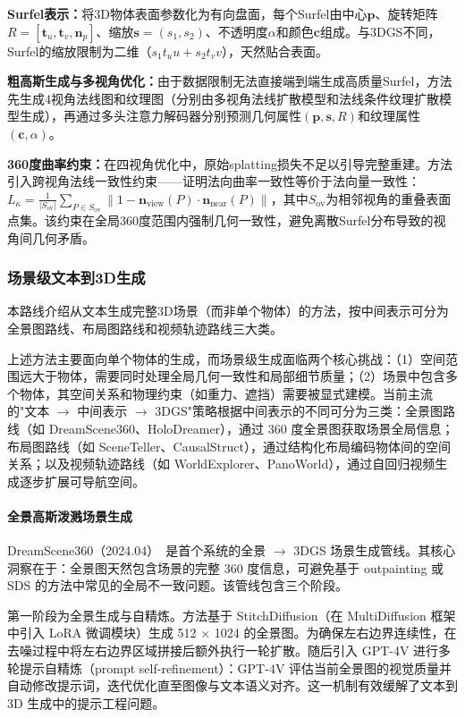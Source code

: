 \textbf{Surfel表示：}将3D物体表面参数化为有向盘面，每个Surfel由中心$\mathbf{p}$、旋转矩阵$R = [\mathbf{t}_u, \mathbf{t}_v, \mathbf{n}_p]$、缩放$\mathbf{s} = (s_1, s_2)$、不透明度$\alpha$和颜色$\mathbf{c}$组成。与3DGS不同，Surfel的缩放限制为二维（$s_1 t_u u + s_2 t_v v$），天然贴合表面。

\textbf{粗高斯生成与多视角优化：}由于数据限制无法直接端到端生成高质量Surfel，方法先生成4视角法线图和纹理图（分别由多视角法线扩散模型和法线条件纹理扩散模型生成），再通过多头注意力解码器分别预测几何属性$(\mathbf{p}, \mathbf{s}, R)$和纹理属性$(\mathbf{c}, \alpha)$。

\textbf{360度曲率约束：}在四视角优化中，原始splatting损失不足以引导完整重建。方法引入跨视角法线一致性约束——证明法向曲率一致性等价于法向量一致性：$L_\kappa = \frac{1}{|S_\text{ov}|}\sum_{P \in S_\text{ov}}\|1 - \mathbf{n}_\text{view}(P) \cdot \mathbf{n}_\text{near}(P)\|$，其中$S_\text{ov}$为相邻视角的重叠表面点集。该约束在全局360度范围内强制几何一致性，避免离散Surfel分布导致的视角间几何矛盾。

\subsubsection{场景级文本到3D生成}

本路线介绍从文本生成完整3D场景（而非单个物体）的方法，按中间表示可分为全景图路线、布局图路线和视频轨迹路线三大类。

上述方法主要面向单个物体的生成，而场景级生成面临两个核心挑战：（1）空间范围远大于物体，需要同时处理全局几何一致性和局部细节质量；（2）场景中包含多个物体，其空间关系和物理约束（如重力、遮挡）需要被显式建模。当前主流的"文本 $\rightarrow$ 中间表示 $\rightarrow$ 3DGS"策略根据中间表示的不同可分为三类：全景图路线（如 DreamScene360、HoloDreamer），通过 360 度全景图获取场景全局信息；布局图路线（如 SceneTeller、CausalStruct），通过结构化布局编码物体间的空间关系；以及视频轨迹路线（如 WorldExplorer、PanoWorld），通过自回归视频生成逐步扩展可导航空间。

\paragraph{全景高斯泼溅场景生成}

DreamScene360（2024.04）~\cite{2404_06903}是首个系统的全景 $\to$ 3DGS 场景生成管线。其核心洞察在于：全景图天然包含场景的完整 360 度信息，可避免基于 outpainting 或 SDS 的方法中常见的全局不一致问题。该管线包含三个阶段。

第一阶段为全景生成与自精炼。方法基于 StitchDiffusion（在 MultiDiffusion 框架中引入 LoRA 微调模块）生成 512 $\times$ 1024 的全景图。为确保左右边界连续性，在去噪过程中将左右边界区域拼接后额外执行一轮扩散。随后引入 GPT-4V 进行多轮提示自精炼（prompt self-refinement）：GPT-4V 评估当前全景图的视觉质量并自动修改提示词，迭代优化直至图像与文本语义对齐。这一机制有效缓解了文本到 3D 生成中的提示工程问题。

